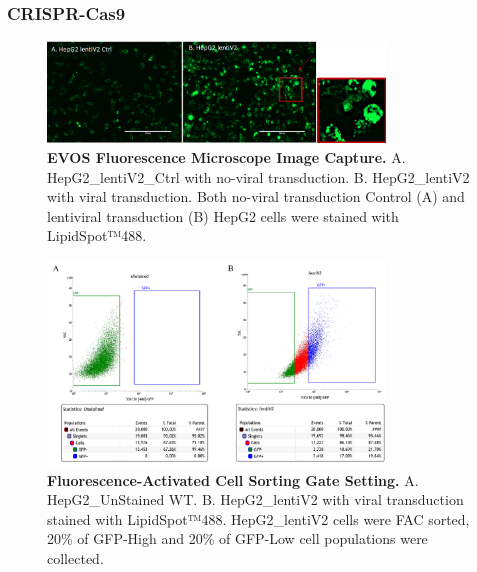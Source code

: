 \documentclass[
  a4paper,
]{article}
\newenvironment{fignos:tagged-figure}[1][]{
  \let\oldfigurename\figurename
  \renewcommand{\figurename}{Supplementary Figure}
}{
  \let\figurename\oldfigurename
}
\begin{document}
\hypertarget{crispr-cas9}{%
\subsubsection{CRISPR-Cas9}\label{crispr-cas9}}

\begin{fignos:tagged-figure}[S8]

\begin{figure}
\hypertarget{fig:sup:crispr:fig1}{%
\centering
\includegraphics[width=0.8\textwidth,height=\textheight]{images/crispr/figure1.png}
\caption{\textbf{EVOS Fluorescence Microscope Image Capture.}
A. HepG2\_lentiV2\_Ctrl with no-viral transduction.
B. HepG2\_lentiV2 with viral transduction.
Both no-viral transduction Control (A) and lentiviral transduction (B) HepG2 cells were stained with LipidSpot™488.}\label{fig:sup:crispr:fig1}
}
\end{figure}

\end{fignos:tagged-figure}

\begin{fignos:tagged-figure}[S9]

\begin{figure}
\hypertarget{fig:sup:crispr:fig2}{%
\centering
\includegraphics[width=0.8\textwidth,height=\textheight]{images/crispr/figure2.png}
\caption{\textbf{Fluorescence-Activated Cell Sorting Gate Setting.}
A. HepG2\_UnStained WT.
B. HepG2\_lentiV2 with viral transduction stained with LipidSpot™488.
HepG2\_lentiV2 cells were FAC sorted, 20\% of GFP-High and 20\% of GFP-Low cell populations were collected.}\label{fig:sup:crispr:fig2}
}
\end{figure}

\end{fignos:tagged-figure}
\end{document}
